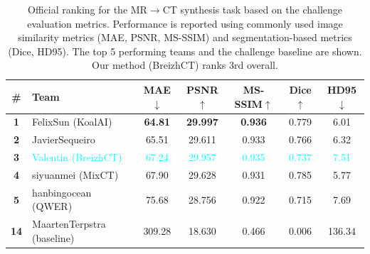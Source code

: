 \begin{table}[h!]
\centering
\scriptsize
\renewcommand{\arraystretch}{1}
\setlength{\tabcolsep}{5pt}
\caption{
Official ranking for the MR$\rightarrow$CT synthesis task based on the challenge evaluation metrics. Performance is reported using commonly used image similarity metrics (MAE, PSNR, MS-SSIM) and segmentation-based metrics (Dice, HD95). The top 5 performing teams and the challenge baseline are shown. Our method (BreizhCT) ranks 3rd overall.
}
\label{tab:mrct_image}
\begin{tabular}{clccccc}
\toprule
\textbf{\#} & \textbf{Team} & \textbf{MAE$\downarrow$} & \textbf{PSNR$\uparrow$} & \textbf{MS-SSIM$\uparrow$} & \textbf{Dice$\uparrow$} & \textbf{HD95$\downarrow$} \\
\midrule
\textbf{1} & FelixSun (KoalAI)      & \textbf{64.81}  & \textbf{29.997} & \textbf{0.936} & 0.779 & 6.01 \\
\textbf{2} & JavierSequeiro         & 65.51  & 29.611 & 0.933 & 0.766 & 6.32 \\
\textbf{3} & \textcolor{cyan}{Valentin (BreizhCT)} & \textcolor{cyan}{67.24}  & \textcolor{cyan}{29.957} & \textcolor{cyan}{0.935} & \textcolor{cyan}{0.737} & \textcolor{cyan}{7.51} \\
\textbf{4} & siyuanmei (MixCT)      & 67.90  & 29.628 & 0.931 & 0.785 & 5.77 \\
\textbf{5} & hanbingocean (QWER)    & 75.68  & 28.756 & 0.922 & 0.715 & 7.69 \\
\midrule
\textbf{14} & MaartenTerpstra (baseline) & 309.28 & 18.630 & 0.466 & 0.006 & 136.34 \\
\bottomrule
\end{tabular}

\end{table}
